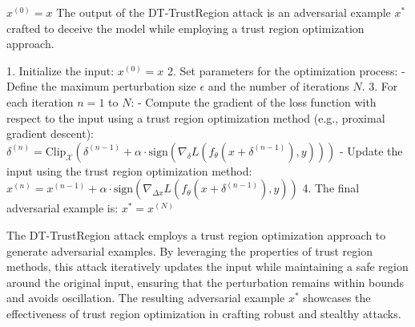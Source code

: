  $x^{(0)} = x$
The output of the DT-TrustRegion attack is an adversarial example $x^*$ crafted to deceive the model while employing a trust region optimization approach.

1. Initialize the input:
   $x^{(0)} = x$
2. Set parameters for the optimization process:
   - Define the maximum perturbation size $\epsilon$ and the number of iterations $N$.
3. For each iteration $n = 1$ to $N$:
   - Compute the gradient of the loss function with respect to the input using a trust region optimization method (e.g., proximal gradient descent):
   $\delta^{(n)} = \text{Clip}_{\mathcal{X}} \left( \delta^{(n-1)} + \alpha \cdot \text{sign} \left( \nabla_\delta L(f_\theta(x + \delta^{(n-1)}), y) \right) \right)$
   - Update the input using the trust region optimization method:
   $x^{(n)} = x^{(n-1)} + \alpha \cdot \text{sign} \left( \nabla_{\Delta x} L(f_\theta(x + \delta^{(n-1)}), y) \right)$
4. The final adversarial example is:
   $x^* = x^{(N)}$

The DT-TrustRegion attack employs a trust region optimization approach to generate adversarial examples. By leveraging the properties of trust region methods, this attack iteratively updates the input while maintaining a safe region around the original input, ensuring that the perturbation remains within bounds and avoids oscillation. The resulting adversarial example $x^*$ showcases the effectiveness of trust region optimization in crafting robust and stealthy attacks.